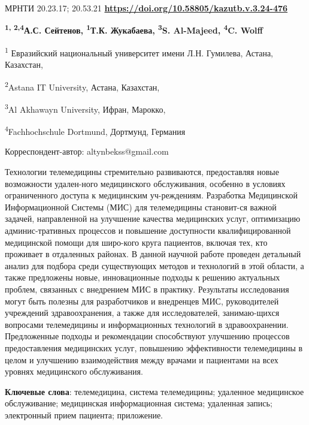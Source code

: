 \newpage
МРНТИ 20.23.17; 20.53.21
\hfill {\bfseries \href{https://doi.org/10.58805/kazutb.v.3.24-476}{https://doi.org/10.58805/kazutb.v.3.24-476}}


\begin{center}

{\bfseries \textsuperscript{1, 2,4}А.С. Сейтенов\envelope,
\textsuperscript{1}Т.К. Жукабаева, \textsuperscript{3}S. Al-Majeed,
\textsuperscript{4}C. Wolff}

\textsuperscript{1} Евразийский национальный университет имени Л.Н.
Гумилева, Астана, Казахстан,

\textsuperscript{2}Astana IT University, Астана, Казахстан,

\textsuperscript{3}Al Akhawayn University, Ифран, Марокко,

\textsuperscript{4}Fachhochschule Dortmund, Дортмунд, Германия
\end{center}
\envelope Корреспондент-автор: altynbekss@gmail.com \vspace{0.5cm}

Технологии телемедицины стремительно развиваются, предоставляя новые
возможности удален-ного медицинского обслуживания, особенно в условиях
ограниченного доступа к медицинским уч-реждениям. Разработка Медицинской
Информационной Системы (МИС) для телемедицины становит-ся важной задачей,
направленной на улучшение качества медицинских услуг, оптимизацию
админис-тративных процессов и повышение доступности квалифицированной
медицинской помощи для широ-кого круга пациентов, включая тех, кто
проживает в отдаленных районах. В данной научной работе проведен
детальный анализ для подбора среди существующих методов и технологий в
этой области, а также предложены новые, инновационные подходы к решению
актуальных проблем, связанных с внедрением МИС в практику. Результаты
исследования могут быть полезны для разработчиков и внедренцев МИС,
руководителей учреждений здравоохранения, а также для исследователей,
занимаю-щихся вопросами телемедицины и информационных технологий в
здравоохранении. Предложенные подходы и рекомендации способствуют
улучшению процессов предоставления медицинских услуг, повышению
эффективности телемедицины в целом и улучшению взаимодействия между
врачами и пациентами на всех уровнях медицинского обслуживания.

{\bfseries Ключевые слова}: телемедицина, система телемедицины; удаленное
медицинское обслуживание; медицинская информационная система; удаленная
запись; электронный прием пациента; приложение.


